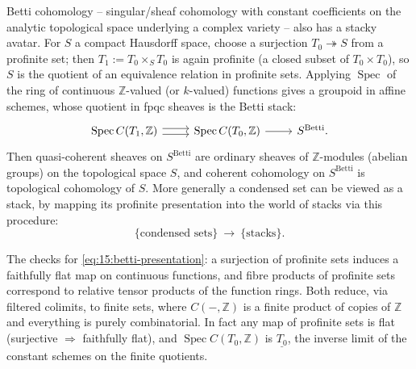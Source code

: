 \begin{example}
\label{ex:15:betti}
Betti cohomology -- singular/sheaf cohomology with constant coefficients on the
analytic topological space underlying a complex variety -- also has a stacky
avatar. For $S$ a compact Hausdorff space, choose a surjection $T_0\twoheadrightarrow S$
from a profinite set; then $T_1 := T_0\times_S T_0$ is again profinite (a closed
subset of $T_0\times T_0$), so $S$ is the quotient of an equivalence relation in
profinite sets. Applying $\operatorname{Spec}$ of the ring of continuous
$\mathbb{Z}$-valued (or $k$-valued) functions gives a groupoid in affine schemes,
whose quotient in fpqc sheaves is the Betti stack:
\begin{equation}
\label{eq:15:betti-presentation}
\begin{tikzcd}
\operatorname{Spec} C(T_1,\mathbb{Z}) \arrow[r, shift left=0.6ex] \arrow[r, shift right=0.6ex] & \operatorname{Spec} C(T_0,\mathbb{Z}) \arrow[r] & S^{\mathrm{Betti}}.
\end{tikzcd}
\end{equation}
Then quasi-coherent sheaves on $S^{\mathrm{Betti}}$ are ordinary sheaves of
$\mathbb{Z}$-modules (abelian groups) on the topological space $S$, and coherent
cohomology on $S^{\mathrm{Betti}}$ is topological cohomology of $S$. More generally a
condensed set can be viewed as a stack, by mapping its profinite presentation into
the world of stacks via this procedure:
\begin{equation*}
\{\text{condensed sets}\}\ \longrightarrow\ \{\text{stacks}\}.
\end{equation*}
\end{example}

\begin{remark}
\label{rmk:15:profinite-descent}
The checks for \eqref{eq:15:betti-presentation}: a surjection of profinite sets
induces a faithfully flat map on continuous functions, and fibre products of
profinite sets correspond to relative tensor products of the function rings. Both
reduce, via filtered colimits, to finite sets, where $C(-,\mathbb{Z})$ is a finite
product of copies of $\mathbb{Z}$ and everything is purely combinatorial. In fact any
map of profinite sets is flat (surjective $\Rightarrow$ faithfully flat), and
$\operatorname{Spec} C(T_0,\mathbb{Z})$ is $\underline{T_0}$, the inverse limit of the
constant schemes on the finite quotients.
\end{remark}

